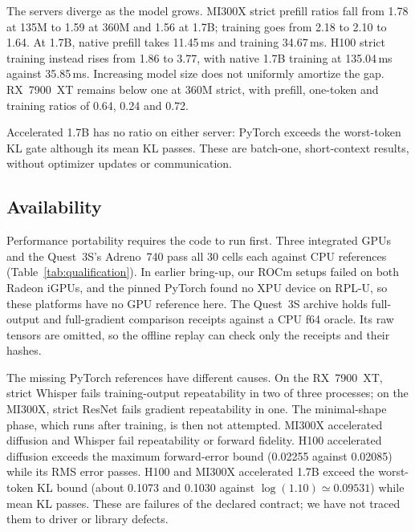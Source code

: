 \documentclass[conference]{IEEEtran}
\begin{document}
The servers diverge as the model grows. MI300X strict prefill ratios fall
from 1.78 at 135M to 1.59 at 360M and 1.56 at 1.7B; training goes from 2.18
to 2.10 to 1.64. At 1.7B, native prefill takes 11.45\,ms and training
34.67\,ms. H100 strict training instead rises from 1.86 to 3.77, with native
1.7B training at 135.04\,ms against 35.85\,ms. Increasing model size does not
uniformly amortize the gap. RX~7900~XT remains below one at 360M strict,
with prefill, one-token and training ratios of 0.64, 0.24 and 0.72.

Accelerated 1.7B has no ratio on either server: PyTorch exceeds the
worst-token KL gate although its mean KL passes. These are batch-one,
short-context results, without optimizer updates or communication.

\subsection{Availability}
\label{sec:availability}

\begin{table}[t]
\caption{Additional Vulkan qualifications against CPU references.
Each cell is one model/profile/phase, with one process per condition.}
\label{tab:qualification}
\centering
\footnotesize
\setlength{\tabcolsep}{4pt}

\end{table}

Performance portability requires the code to run first. Three
integrated GPUs and the Quest~3S's Adreno~740 pass all 30 cells each against
CPU references (Table~\ref{tab:qualification}). In earlier bring-up, our
ROCm setups failed on both Radeon iGPUs, and the pinned PyTorch found no XPU
device on RPL-U, so these platforms have no GPU reference here. The Quest~3S
archive holds full-output and full-gradient comparison receipts against a
CPU f64 oracle. Its raw tensors are omitted, so the offline replay can check
only the receipts and their hashes.

The missing PyTorch references have different causes. On the RX~7900~XT,
strict Whisper fails training-output repeatability in two of three processes;
on the MI300X, strict ResNet fails gradient repeatability in one. The minimal-shape
phase, which runs after training, is then not attempted. MI300X accelerated
diffusion and Whisper fail repeatability or forward fidelity. H100
accelerated diffusion exceeds the maximum forward-error bound (0.02255
against 0.02085) while its RMS error passes. H100 and MI300X accelerated
1.7B exceed the worst-token KL bound (about 0.1073 and 0.1030 against
$\log(1.10)\simeq0.09531$) while mean KL passes. These are failures of the
declared contract; we have not traced them to driver or library defects.
\end{document}
